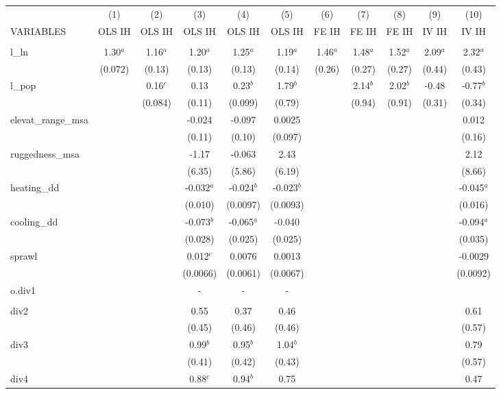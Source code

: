 \documentclass[]{article}
\begin{document}
\begin{tabular}{lcccccccccc} \hline
 & (1) & (2) & (3) & (4) & (5) & (6) & (7) & (8) & (9) & (10) \\
VARIABLES & OLS IH & OLS IH & OLS IH & OLS IH & OLS IH & FE IH & FE IH & FE IH & IV IH & IV IH \\ \hline
 &  &  &  &  &  &  &  &  &  &  \\
l\_ln & 1.30$^a$ & 1.16$^a$ & 1.20$^a$ & 1.25$^a$ & 1.19$^a$ & 1.46$^a$ & 1.48$^a$ & 1.52$^a$ & 2.09$^a$ & 2.32$^a$ \\
 & (0.072) & (0.13) & (0.13) & (0.13) & (0.14) & (0.26) & (0.27) & (0.27) & (0.44) & (0.43) \\
l\_pop &  & 0.16$^c$ & 0.13 & 0.23$^b$ & 1.79$^b$ &  & 2.14$^b$ & 2.02$^b$ & -0.48 & -0.77$^b$ \\
 &  & (0.084) & (0.11) & (0.099) & (0.79) &  & (0.94) & (0.91) & (0.31) & (0.34) \\
elevat\_range\_msa &  &  & -0.024 & -0.097 & 0.0025 &  &  &  &  & 0.012 \\
 &  &  & (0.11) & (0.10) & (0.097) &  &  &  &  & (0.16) \\
ruggedness\_msa &  &  & -1.17 & -0.063 & 2.43 &  &  &  &  & 2.12 \\
 &  &  & (6.35) & (5.86) & (6.19) &  &  &  &  & (8.66) \\
heating\_dd &  &  & -0.032$^a$ & -0.024$^b$ & -0.023$^b$ &  &  &  &  & -0.045$^a$ \\
 &  &  & (0.010) & (0.0097) & (0.0093) &  &  &  &  & (0.016) \\
cooling\_dd &  &  & -0.073$^b$ & -0.065$^a$ & -0.040 &  &  &  &  & -0.094$^a$ \\
 &  &  & (0.028) & (0.025) & (0.025) &  &  &  &  & (0.035) \\
sprawl &  &  & 0.012$^c$ & 0.0076 & 0.0013 &  &  &  &  & -0.0029 \\
 &  &  & (0.0066) & (0.0061) & (0.0067) &  &  &  &  & (0.0092) \\
o.div1 &  &  & - & - & - &  &  &  &  &  \\
 &  &  &  &  &  &  &  &  &  &  \\
div2 &  &  & 0.55 & 0.37 & 0.46 &  &  &  &  & 0.61 \\
 &  &  & (0.45) & (0.46) & (0.46) &  &  &  &  & (0.57) \\
div3 &  &  & 0.99$^b$ & 0.95$^b$ & 1.04$^b$ &  &  &  &  & 0.79 \\
 &  &  & (0.41) & (0.42) & (0.43) &  &  &  &  & (0.57) \\
div4 &  &  & 0.88$^c$ & 0.94$^b$ & 0.75 &  &  &  &  & 0.47 \\

\end{tabular}
\end{document}
